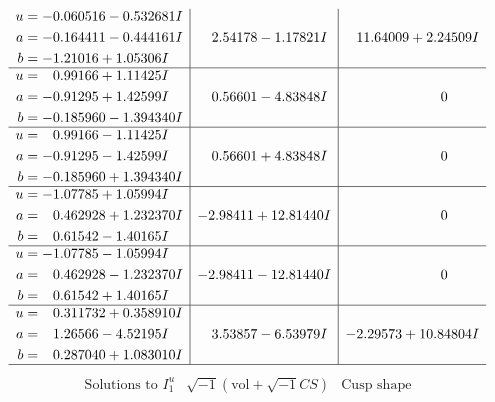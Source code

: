\documentclass[1p]{elsarticle_modified}
\theoremstyle{definition}
\newcommand{\I}{\sqrt{-1}}
\begin{document}
$$\begin{array}{c|c|c}
\begin{aligned}
u &= -0.060516 - 0.532681 I \\
a &= -0.164411 - 0.444161 I \\
b &= -1.21016 + 1.05306 I\end{aligned}
 & \phantom{-}2.54178 - 1.17821 I & \phantom{-}11.64009 + 2.24509 I \\ \hline\begin{aligned}
u &= \phantom{-}0.99166 + 1.11425 I \\
a &= -0.91295 + 1.42599 I \\
b &= -0.185960 - 1.394340 I\end{aligned}
 & \phantom{-}0.56601 - 4.83848 I & \phantom{-0.000000 } 0 \\ \hline\begin{aligned}
u &= \phantom{-}0.99166 - 1.11425 I \\
a &= -0.91295 - 1.42599 I \\
b &= -0.185960 + 1.394340 I\end{aligned}
 & \phantom{-}0.56601 + 4.83848 I & \phantom{-0.000000 } 0 \\ \hline\begin{aligned}
u &= -1.07785 + 1.05994 I \\
a &= \phantom{-}0.462928 + 1.232370 I \\
b &= \phantom{-}0.61542 - 1.40165 I\end{aligned}
 & -2.98411 + 12.81440 I & \phantom{-0.000000 } 0 \\ \hline\begin{aligned}
u &= -1.07785 - 1.05994 I \\
a &= \phantom{-}0.462928 - 1.232370 I \\
b &= \phantom{-}0.61542 + 1.40165 I\end{aligned}
 & -2.98411 - 12.81440 I & \phantom{-0.000000 } 0 \\ \hline\begin{aligned}
u &= \phantom{-}0.311732 + 0.358910 I \\
a &= \phantom{-}1.26566 - 4.52195 I \\
b &= \phantom{-}0.287040 + 1.083010 I\end{aligned}
 & \phantom{-}3.53857 - 6.53979 I & -2.29573 + 10.84804 I\\
 \hline 
 \end{array}$$\newpage$$\begin{array}{c|c|c}  
\text{Solutions to }I^u_{1}& \I (\text{vol} + \sqrt{-1}CS) & \text{Cusp shape}\\
 \hline 
\begin{aligned}

\end{aligned}
\end{array}$$
\end{document}
